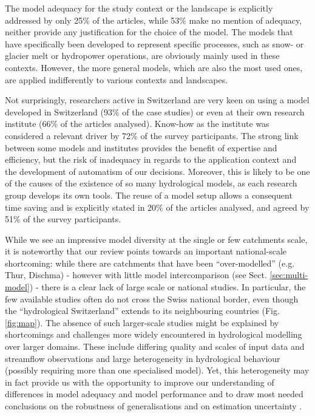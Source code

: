 \documentclass[10pt,a4paper]{article}
\begin{document}
The model adequacy for the study context or the landscape is explicitly addressed by only 25\% of the articles, while 53\% make no mention of adequacy, neither provide any justification for the choice of the model. The models that have specifically been developed to represent specific processes, such as snow- or glacier melt or hydropower operations, are obviously mainly used in these contexts. However, the more general models, which are also the most used ones, are applied indifferently to various contexts and landscapes.

Not surprisingly, researchers active in Switzerland are very keen on using a model developed in Switzerland (93\% of the case studies) or even at their own research institute (66\% of the articles analysed). Know-how as the institute was considered a relevant driver by 72\% of the survey participants. The strong link between some models and institutes provides the benefit of expertise and efficiency, but the risk of inadequacy in regards to the application context and the development of automatism of our decisions. Moreover, this is likely to be one of the causes of the existence of so many hydrological models, as each research group develops its own tools. The reuse of a model setup allows a consequent time saving and is explicitly stated in 20\% of the articles analysed, and agreed by 51\% of the survey participants.

While we see an impressive model diversity at the single or few catchments scale, it is noteworthy that our review points towards an important national-scale shortcoming: while there are catchments that have been ``over-modelled'' (e.g. Thur, Dischma) - however with little model intercomparison (see Sect. \ref{sec:multi-model}) - there is a clear lack of large scale or national studies. In particular, the few available studies often do not cross the Swiss national border, even though the ``hydrological Switzerland'' extends to its neighbouring countries (Fig. \ref{fig:map}). The absence of such larger-scale studies might be explained by shortcomings and challenges more widely encountered in hydrological modelling over larger domains. These include differing quality and scales of input data and streamflow observations and large heterogeneity in hydrological behaviour (possibly requiring more than one specialised model). Yet, this heterogeneity may in fact provide us with the opportunity to improve our understanding of differences in model adequacy and model performance and to draw most needed conclusions on the robustness of generalisations and on estimation uncertainty \citep{Gupta2014, McMillan2016}.
\end{document}
